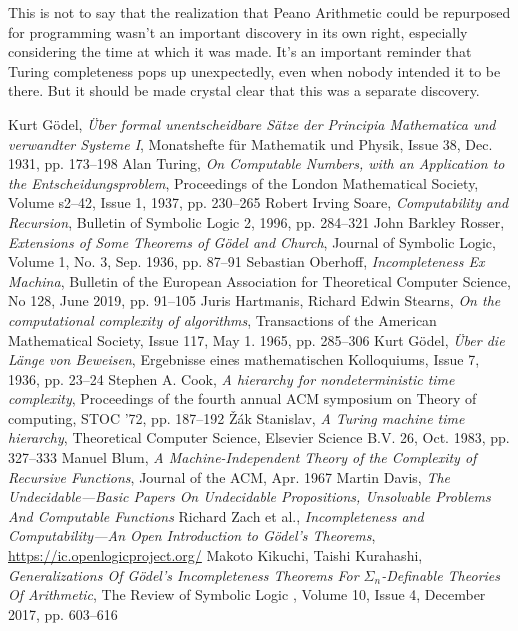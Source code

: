 \documentclass{article}
\theoremstyle{customstyle}
\begin{document}
This is not to say that the realization that Peano Arithmetic could be repurposed for programming wasn't an important discovery in its own right, especially considering the time at which it was made. It's an important reminder that Turing completeness pops up unexpectedly, even when nobody intended it to be there. But it should be made crystal clear that this was a separate discovery. 

\begin{thebibliography}{6}
Kurt Gödel, \textit{Über formal unentscheidbare Sätze der Principia Mathematica und verwandter Systeme I}, Monatshefte für Mathematik und Physik, Issue 38, Dec. 1931, pp. 173--198
Alan Turing, \textit{On Computable Numbers, with an Application to the Entscheidungsproblem}, Proceedings of the London Mathematical Society, Volume s2--42, Issue 1, 1937, pp. 230--265
Robert Irving Soare, \textit{Computability and Recursion}, Bulletin of Symbolic Logic 2, 1996, pp. 284--321
John Barkley Rosser, \textit{Extensions of Some Theorems of Gödel and Church}, Journal of Symbolic Logic, Volume 1, No. 3, Sep. 1936, pp. 87--91
Sebastian Oberhoff, \textit{Incompleteness Ex Machina}, Bulletin of the European Association for Theoretical Computer Science, No 128, June 2019, pp. 91--105
Juris Hartmanis, Richard Edwin Stearns, \textit{On the computational complexity of algorithms}, Transactions of the American Mathematical Society, Issue 117, May 1. 1965, pp. 285--306
Kurt Gödel, \textit{Über die Länge von Beweisen}, Ergebnisse eines mathematischen Kolloquiums, Issue 7, 1936, pp. 23--24
Stephen A. Cook, \textit{A hierarchy for nondeterministic time complexity}, Proceedings of the fourth annual ACM symposium on Theory of computing, STOC '72, pp. 187--192
\v{Z}ák Stanislav, \textit{A Turing machine time hierarchy}, Theoretical Computer Science, Elsevier Science B.V. 26, Oct. 1983, pp. 327--333
Manuel Blum, \textit{A Machine-Independent Theory of the Complexity of Recursive Functions}, Journal of the ACM, Apr. 1967
Martin Davis, \textit{The Undecidable---Basic Papers On Undecidable Propositions, Unsolvable Problems And Computable Functions}
Richard Zach et al., \textit{Incompleteness and Computability---An Open Introduction to Gödel's Theorems}, \url{https://ic.openlogicproject.org/}
Makoto Kikuchi, Taishi Kurahashi, \textit{Generalizations Of Gödel's Incompleteness Theorems For $\Sigma_n$-Definable Theories Of Arithmetic}, The Review of Symbolic Logic , Volume 10, Issue 4, December 2017, pp. 603--616
\end{thebibliography}

\vfill\eject
\end{document}
